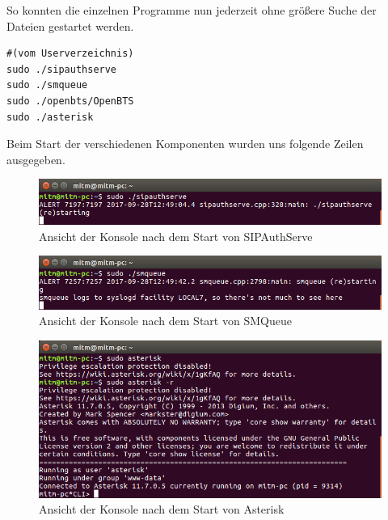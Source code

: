 So konnten die einzelnen Programme nun jederzeit ohne größere Suche der Dateien gestartet werden.
\begin{lstlisting}
#(vom Userverzeichnis)
sudo ./sipauthserve
sudo ./smqueue
sudo ./openbts/OpenBTS
sudo ./asterisk
\end{lstlisting}

Beim Start der verschiedenen Komponenten wurden uns folgende Zeilen ausgegeben.\\
\begin{figure}[htbp]
	\centering
		\includegraphics[width=1.00\textwidth]{includes/Start_sipauthserve}
	\caption{Ansicht der Konsole nach dem Start von SIPAuthServe}
	\label{fig:start_sipauthserve}
\end{figure}

\begin{figure}[htbp]
	\centering
		\includegraphics[width=1.00\textwidth]{includes/Start_smqueue}
	\caption{Ansicht der Konsole nach dem Start von SMQueue}
	\label{fig:start_smqueue}
\end{figure}

\begin{figure}[htbp]
	\centering
		\includegraphics[width=1.00\textwidth]{includes/Start_asterisk}
	\caption{Ansicht der Konsole nach dem Start von Asterisk}
	\label{fig:start_asterisk}
\end{figure}

